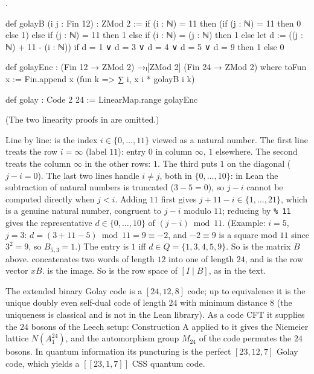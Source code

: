 \begin{definition}\label{ch02:def:golay}
.
\end{definition}
\begin{leancode}
def golayB (i j : Fin 12) : ZMod 2 :=
  if (i : ℕ) = 11 then (if (j : ℕ) = 11 then 0 else 1)
  else if (j : ℕ) = 11 then 1
  else if (i : ℕ) = (j : ℕ) then 1
  else
    let d := ((j : ℕ) + 11 - (i : ℕ)) %
    if d = 1 ∨ d = 3 ∨ d = 4 ∨ d = 5 ∨ d = 9 then 1 else 0

def golayEnc : (Fin 12 → ZMod 2) →ₗ[ZMod 2] (Fin 24 → ZMod 2) where
  toFun x := Fin.append x (fun k => ∑ i, x i * golayB i k)

def golay : Code 2 24 := LinearMap.range golayEnc
\end{leancode}
(The two linearity proofs in  are omitted.)
\begin{dictionary}
Line by line:  is the index $i\in\{0,\dots,11\}$ viewed as a natural number.
The first line treats the row $i=\infty$ (label $11$): entry $0$ in column $\infty$, $1$
elsewhere.  The second treats the column $\infty$ in the other rows: $1$.  The third puts $1$ on
the diagonal ($j-i=0$).  The last two lines handle $i\ne j$, both in $\{0,\dots,10\}$: in Lean the
subtraction of natural numbers is truncated ($3-5=0$), so $j-i$ cannot be computed directly when
$j<i$.  Adding $11$ first gives $j+11-i\in\{1,\dots,21\}$, which is a genuine natural number,
congruent to $j-i$ modulo $11$; reducing by \texttt{\% 11} gives the representative $d\in\{0,\dots,10\}$
of $(j-i)\bmod 11$.  (Example: $i=5$, $j=3$: $d=(3+11-5)\bmod11=9\equiv-2$, and $-2\equiv9$ is a
square mod $11$ since $3^2=9$, so $B_{5,3}=1$.)  The entry is $1$ iff $d\in Q=\{1,3,4,5,9\}$.  So
 is the matrix $B$ above.   concatenates two words of length $12$ into one of length
$24$, and  is the row vector $xB$.  
is the image.  So  is the row space of $[I\mid B]$, as in the text.
\end{dictionary}
\begin{physics}
The extended binary Golay code is a $[24,12,8]$ code; up to equivalence it is the unique doubly even self-dual code of length $24$ with minimum distance $8$ (the uniqueness is classical and is not in the Lean library). As a code CFT it supplies the $24$ bosons of the Leech setup: Construction A applied to it gives the Niemeier lattice $N(A_1^{24})$, and the automorphism group $M_{24}$ of the code permutes the $24$ bosons. In quantum information its puncturing is the perfect $[23,12,7]$ Golay code, which yields a $[[23,1,7]]$ CSS quantum code.
\end{physics}

